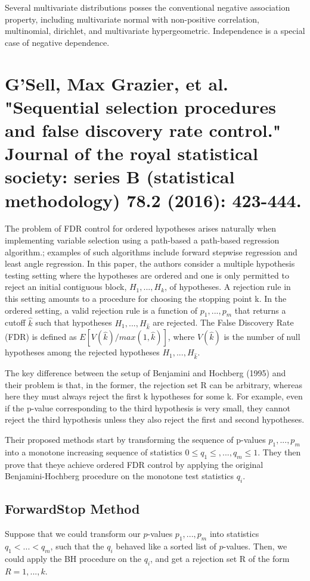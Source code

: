 \documentclass{article}
\begin{document}
Several multivariate distributions posses the conventional negative association property, including multivariate normal with non-positive correlation, multinomial, dirichlet, and multivariate hypergeometric. Independence is a special case of negative dependence.

\cleardoublepage
\section{G'Sell, Max Grazier, et al. "Sequential selection procedures and false discovery rate control." Journal of the royal statistical society: series B (statistical methodology) 78.2 (2016): 423-444.}
The problem of FDR control for ordered hypotheses arises naturally when implementing variable selection using a path-based a path-based regression algorithm.; examples of such algorithms include forward stepwise regression and least angle regression. In this paper, the authors consider a multiple hypothesis testing setting where the hypotheses are ordered and one is only permitted to reject an initial contiguous block, $H_1,...,H_k$, of hypotheses. A rejection rule in this setting amounts to a procedure for choosing the stopping point k.  In the ordered setting, a valid rejection rule is a function of $p_1 , ..., p_m$ that returns a cutoff $\hat{k}$ such that hypotheses $H_1,...,H_{\hat{k}}$ are rejected. The False Discovery Rate (FDR) is defined as $E[V(\hat{k})/max(1,\hat{k})]$, where $V(\hat{k})$ is the number of null hypotheses among the rejected hypotheses $H_1, ... , H_{\hat{k}}$.

The key difference between the setup of Benjamini and Hochberg (1995) and their problem is that, in the former, the rejection set R can be arbitrary, whereas here they must always reject the first k hypotheses for some k. For example, even if the p-value corresponding
to the third hypothesis is very small, they cannot reject the third hypothesis unless they also reject the first and second hypotheses.

Their proposed methods start by transforming the sequence of p-values $p_1, ..., p_m$ into a monotone increasing sequence of statistics $0 \leq q_1 \leq ,...,q_m \leq 1$. They then prove that theye achieve ordered FDR control by applying the original
Benjamini-Hochberg procedure on the monotone test statistics $q_i$.

\subsection{ForwardStop Method}
Suppose that we could transform our $p$-values $p_1, ..., p_m$ into statistics $q_1 <...< q_m$, such that the $q_i$ behaved like a sorted list of $p$-values. Then, we could apply the BH procedure on the $q_i$, and get a rejection set R of the form $R = {1,...,k}$.
\end{document}
